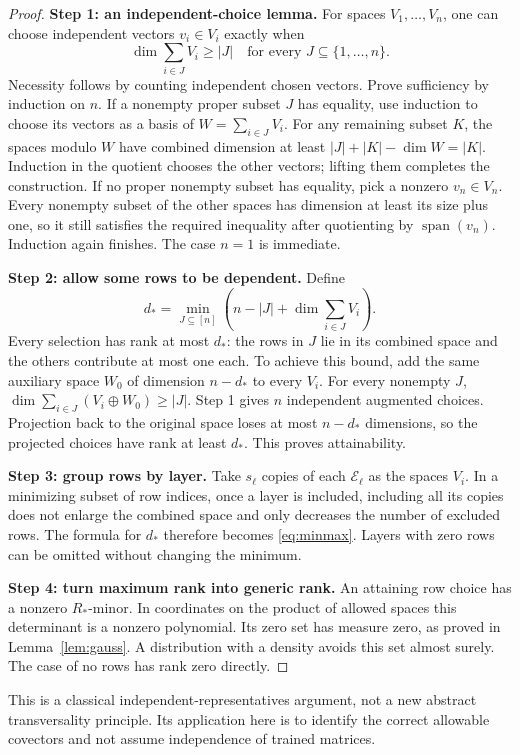 \documentclass[12pt,a4paper]{article}
\theoremstyle{readable}
\theoremstyle{definition}\newtheorem{example}[theorem]{Example}
\newcommand{\Span}{\operatorname{span}}\newcommand{\diag}{\operatorname{diag}}
\begin{document}
\begin{proof}
\textbf{Step 1: an independent-choice lemma.} For spaces \(V_1,\ldots,V_n\), one can choose independent vectors \(v_i\in V_i\) exactly when
\[
\dim\sum_{i\in J}V_i\ge|J|\quad\text{for every }J\subseteq\{1,\ldots,n\}.
\]
Necessity follows by counting independent chosen vectors. Prove sufficiency by induction on \(n\). If a nonempty proper subset \(J\) has equality, use induction to choose its vectors as a basis of \(W=\sum_{i\in J}V_i\). For any remaining subset \(K\), the spaces modulo \(W\) have combined dimension at least
\(|J|+|K|-\dim W=|K|\). Induction in the quotient chooses the other vectors; lifting them completes the construction. If no proper nonempty subset has equality, pick a nonzero \(v_n\in V_n\). Every nonempty subset of the other spaces has dimension at least its size plus one, so it still satisfies the required inequality after quotienting by \(\Span(v_n)\). Induction again finishes. The case \(n=1\) is immediate.

\textbf{Step 2: allow some rows to be dependent.} Define
\[
d_* =\min_{J\subseteq[n]}\left(n-|J|+\dim\sum_{i\in J}V_i\right).
\]
Every selection has rank at most \(d_*\): the rows in \(J\) lie in its combined space and the others contribute at most one each. To achieve this bound, add the same auxiliary space \(W_0\) of dimension \(n-d_*\) to every \(V_i\). For every nonempty \(J\),
\(\dim\sum_{i\in J}(V_i\oplus W_0)\ge|J|\).
Step 1 gives \(n\) independent augmented choices. Projection back to the original space loses at most \(n-d_*\) dimensions, so the projected choices have rank at least \(d_*\). This proves attainability.

\textbf{Step 3: group rows by layer.} Take \(s_\ell\) copies of each \(\mathcal E_\ell\) as the spaces \(V_i\). In a minimizing subset of row indices, once a layer is included, including all its copies does not enlarge the combined space and only decreases the number of excluded rows. The formula for \(d_*\) therefore becomes \eqref{eq:minmax}. Layers with zero rows can be omitted without changing the minimum.

\textbf{Step 4: turn maximum rank into generic rank.} An attaining row choice has a nonzero \(R_*\)-minor. In coordinates on the product of allowed spaces this determinant is a nonzero polynomial. Its zero set has measure zero, as proved in Lemma~\ref{lem:gauss}. A distribution with a density avoids this set almost surely. The case of no rows has rank zero directly.
\end{proof}
This is a classical independent-representatives argument, not a new abstract transversality principle. Its application here is to identify the correct allowable covectors and not assume independence of trained matrices.
\end{document}
